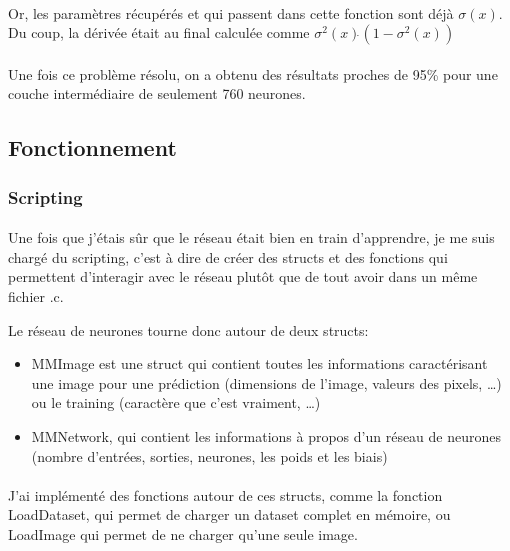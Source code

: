 \documentclass{article}
\begin{document}
\paragraph{}Or, les paramètres récupérés et qui passent dans cette fonction sont déjà $\sigma(x)$. Du coup, la dérivée était au final calculée comme $\sigma^2(x)\dot{}(1 - \sigma^2(x))$

\paragraph{}Une fois ce problème résolu, on a obtenu des résultats proches de 95\% pour une couche intermédiaire de seulement 760 neurones.

\subsection{Fonctionnement}

\subsubsection{Scripting}

\paragraph{}Une fois que j'étais sûr que le réseau était bien en train d'apprendre, je me suis chargé du scripting, c'est à dire de créer des structs et des fonctions qui permettent d'interagir avec le réseau plutôt que de tout avoir dans un même fichier .c.

Le réseau de neurones tourne donc autour de deux structs: 

\begin{itemize}
	\item MMImage est une struct qui contient toutes les informations caractérisant une image pour une prédiction (dimensions de l'image, valeurs des pixels, …) ou le training (caractère que c'est vraiment, …)
	\item MMNetwork, qui contient les informations à propos d'un réseau de neurones (nombre d'entrées, sorties, neurones, les poids et les biais)
\end{itemize}

\paragraph{}J'ai implémenté des fonctions autour de ces structs, comme la fonction LoadDataset, qui permet de charger un dataset complet en mémoire, ou LoadImage qui permet de ne charger qu'une seule image.
\end{document}
